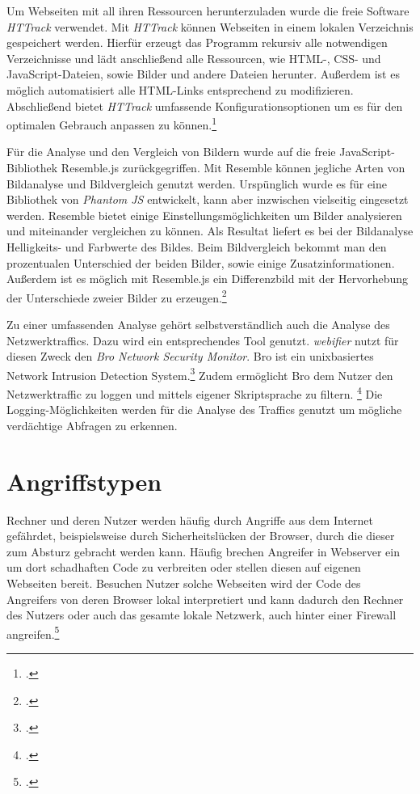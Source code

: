 Um Webseiten mit all ihren Ressourcen herunterzuladen wurde die freie Software \textit{HTTrack}
verwendet. Mit \textit{HTTrack} können Webseiten in einem lokalen Verzeichnis gespeichert werden.
Hierfür erzeugt das Programm rekursiv alle notwendigen Verzeichnisse und lädt anschließend alle
Ressourcen, wie \ac{HTML}-, \ac{CSS}- und JavaScript-Dateien, sowie Bilder und andere Dateien
herunter. Außerdem ist es möglich automatisiert alle \ac{HTML}-Links entsprechend zu modifizieren.
Abschließend bietet \textit{HTTrack} umfassende Konfigurationsoptionen um es für den optimalen
Gebrauch anpassen zu können.\footcite[Vgl.][]{httrack}

Für die Analyse und den Vergleich von Bildern wurde auf die freie JavaScript-Bibliothek Resemble.js
zurückgegriffen. Mit Resemble können jegliche Arten von Bildanalyse und Bildvergleich genutzt
werden. Urspünglich wurde es für eine Bibliothek von \textit{Phantom JS} entwickelt, kann aber
inzwischen vielseitig eingesetzt werden. Resemble bietet einige Einstellungsmöglichkeiten um Bilder
analysieren und miteinander vergleichen zu können. Als Resultat liefert es bei der Bildanalyse
Helligkeits- und Farbwerte des Bildes. Beim Bildvergleich bekommt man den prozentualen Unterschied
der beiden Bilder, sowie einige Zusatzinformationen. Außerdem ist es möglich mit Resemble.js ein
Differenzbild mit der Hervorhebung der Unterschiede zweier Bilder zu erzeugen.\footcite[Vgl.][]{resemblejs}

Zu einer umfassenden Analyse gehört selbstverständlich auch die Analyse des Netzwerktraffics. Dazu
wird ein entsprechendes Tool genutzt. \textit{webifier} nutzt für diesen Zweck den \textit{Bro
Network Security Monitor}. Bro ist ein unixbasiertes Network Intrusion Detection System.\footcite[Vgl.][199]{bro} Zudem
ermöglicht Bro dem Nutzer den Netzwerktraffic zu loggen und mittels eigener Skriptsprache zu filtern. \footcite[Vgl.][]{bro2} Die Logging-Möglichkeiten werden für die Analyse des Traffics genutzt um mögliche verdächtige Abfragen zu erkennen.


\section{Angriffstypen}

Rechner und deren Nutzer werden häufig durch Angriffe aus dem Internet gefährdet, beispielsweise
durch Sicherheitslücken der Browser, durch die dieser zum Absturz gebracht werden kann. Häufig
brechen Angreifer in Webserver ein um dort schadhaften Code zu verbreiten oder stellen diesen auf
eigenen Webseiten bereit. Besuchen Nutzer solche Webseiten wird der Code des Angreifers von deren
Browser lokal interpretiert und kann dadurch den Rechner des Nutzers oder auch das gesamte lokale
Netzwerk, auch hinter einer Firewall angreifen.\footcite[Vgl.][1\psqq]{clientSideAttacks}

